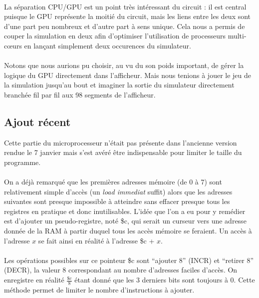 \documentclass{article}
\begin{document}
\paragraph{}La séparation CPU/GPU est un point très intéressant du circuit : il est central puisque le GPU représente la moitié du circuit, mais les liens entre les deux sont d'une part peu nombreux et d'autre part à sens unique. Cela nous a permis de couper la simulation en deux afin d'optimiser l'utilisation de processeurs multi-cœurs en lançant simplement deux occurences du simulateur.

\paragraph{}Notons que nous aurions pu choisir, au vu du son poids important, de gérer la logique du GPU directement dans l'afficheur. Mais nous tenions à jouer le jeu de la simulation jusqu'au bout et imaginer la sortie du simulateur directement branchée fil par fil aux 98 segments de l'afficheur.

\subsection{Ajout récent}
\label{micro_update}
Cette partie du microprocesseur n'était pas présente dans l'ancienne version rendue le 7 janvier mais s'est avéré être indispensable pour limiter le taille du programme.

\paragraph{}On a déjà remarqué que les premières adresses mémoire (de 0 à 7) sont relativement simple d'accès (un \emph{load immediat} suffit) alors que les adresses suivantes sont presque impossible à atteindre sans effacer presque tous les registres en pratique et donc inutilisables. L'idée que l'on a eu pour y remédier est d'ajouter un pseudo-registre, noté \$c, qui serait un curseur vers une adresse donnée de la RAM à partir duquel tous les accès mémoire se feraient. Un accès à l'adresse $x$ se fait ainsi en réalité à l'adresse \$c + $x$.

\paragraph{}Les opérations possibles sur ce pointeur \$c sont “ajouter 8” (INCR) et “retirer 8” (DECR), la valeur 8 correspondant au nombre d'adresses faciles d'accès. On enregistre en réalité $\frac{\$c}8$ étant donné que les 3 derniers bits sont toujours à 0. Cette méthode permet de limiter le nombre d'instructions à ajouter.
\end{document}
